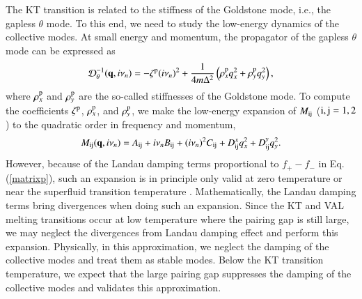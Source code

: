 \documentclass[aps,prd,amsmath,two column,nofootinbib,amssymb,referee]{revtex4}
\begin{document}
The KT transition is related to the stiffness of the Goldstone mode, i.e., the gapless $\theta$ mode. To this end, we need to study the low-energy dynamics of the collective modes. At small energy and momentum, 
the propagator of the gapless $\theta$ mode can be expressed as
\begin{eqnarray}\label{GM-EXP}
{\cal D}_\theta^{-1}({\bf q},i\nu_n)=-\zeta^{\rm p}(i\nu_n)^2+\frac{1}{4m\Delta^2}\left(\rho_x^{\rm p}q_x^2+\rho_y^{\rm p}q_y^2\right),
\end{eqnarray}
where $\rho_x^{\rm p}$ and $\rho_y^{\rm p}$ are the so-called stiffnesses of the Goldstone mode.
To compute the coefficients $\zeta^{\rm p}$, $\rho_x^{\rm p}$, and $\rho_y^{\rm p}$, we make the low-energy expansion of $M_{\rm ij}$ (${\rm i,j}=1,2$) to the quadratic order in frequency and momentum, 
\begin{eqnarray}
M_{\rm ij}({\bf q},i\nu_n)=A_{\rm ij}+i\nu_nB_{\rm ij}+(i\nu_n)^2C_{\rm ij}+D_{\rm ij}^xq_x^2+D_{\rm ij}^yq_y^2.
\end{eqnarray}
However, because of the Landau damping terms proportional to $f_+-f_-$ in Eq. (\ref{matrixp}), such an expansion is in principle only valid at zero temperature or near the superfluid transition temperature 
\cite{Engelbrecht1997, EXPANSION}.  Mathematically, the Landau damping terms bring divergences when doing such an expansion. Since the KT and VAL melting transitions occur at low temperature where the pairing gap is still large,  we may neglect the divergences from Landau damping effect and perform this expansion. Physically, in this approximation, we neglect the damping of the collective modes and treat them as stable modes. Below the KT transition temperature, we expect that the large pairing gap suppresses the damping of the collective modes and validates this approximation. 
\end{document}
